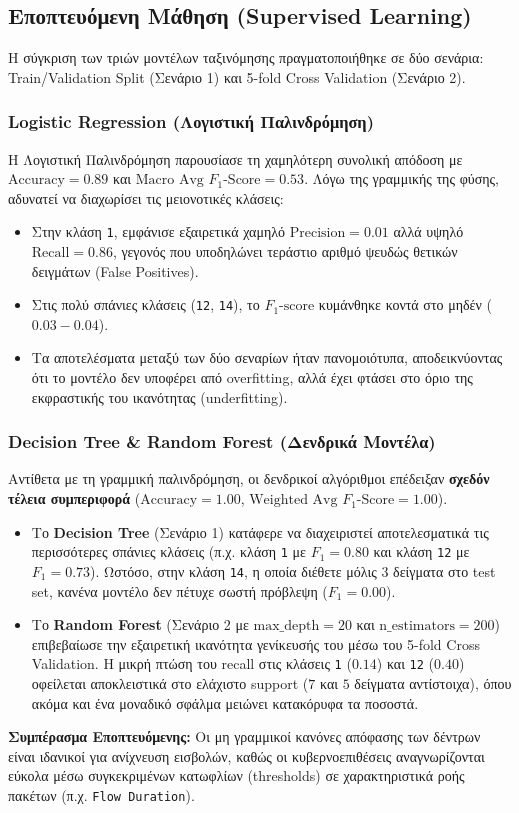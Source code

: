 \documentclass[11pt,a4paper]{article}
\begin{document}
	\subsection{Εποπτευόμενη Μάθηση (Supervised Learning)}
	Η σύγκριση των τριών μοντέλων ταξινόμησης πραγματοποιήθηκε σε δύο σενάρια: Train/Validation Split (Σενάριο 1) και 5-fold Cross Validation (Σενάριο 2).
	
	\subsubsection{Logistic Regression (Λογιστική Παλινδρόμηση)}
	Η Λογιστική Παλινδρόμηση παρουσίασε τη χαμηλότερη συνολική απόδοση με $\text{Accuracy} = 0.89$ και $\text{Macro Avg } F_1\text{-Score} = 0.53$. Λόγω της γραμμικής της φύσης, αδυνατεί να διαχωρίσει τις μειονοτικές κλάσεις:
	\begin{itemize}
		\item Στην κλάση \texttt{1}, εμφάνισε εξαιρετικά χαμηλό $\text{Precision} = 0.01$ αλλά υψηλό $\text{Recall} = 0.86$, γεγονός που υποδηλώνει τεράστιο αριθμό ψευδώς θετικών δειγμάτων (False Positives).
		\item Στις πολύ σπάνιες κλάσεις (\texttt{12}, \texttt{14}), το $F_1\text{-score}$ κυμάνθηκε κοντά στο μηδέν ($0.03 - 0.04$).
		\item Τα αποτελέσματα μεταξύ των δύο σεναρίων ήταν πανομοιότυπα, αποδεικνύοντας ότι το μοντέλο δεν υποφέρει από overfitting, αλλά έχει φτάσει στο όριο της εκφραστικής του ικανότητας (underfitting).
	\end{itemize}
	
	\subsubsection{Decision Tree \& Random Forest (Δενδρικά Μοντέλα)}
	Αντίθετα με τη γραμμική παλινδρόμηση, οι δενδρικοί αλγόριθμοι επέδειξαν \textbf{σχεδόν τέλεια συμπεριφορά} ($\text{Accuracy} = 1.00$, $\text{Weighted Avg } F_1\text{-Score} = 1.00$).
	\begin{itemize}
		\item Το \textbf{Decision Tree} (Σενάριο 1) κατάφερε να διαχειριστεί αποτελεσματικά τις περισσότερες σπάνιες κλάσεις (π.χ. κλάση \texttt{1} με $F_1 = 0.80$ και κλάση \texttt{12} με $F_1 = 0.73$). Ωστόσο, στην κλάση \texttt{14}, η οποία διέθετε μόλις $3$ δείγματα στο test set, κανένα μοντέλο δεν πέτυχε σωστή πρόβλεψη ($F_1 = 0.00$).
		\item Το \textbf{Random Forest} (Σενάριο 2 με $\text{max\_depth} = 20$ και $\text{n\_estimators} = 200$) επιβεβαίωσε την εξαιρετική ικανότητα γενίκευσής του μέσω του 5-fold Cross Validation. Η μικρή πτώση του recall στις κλάσεις \texttt{1} ($0.14$) και \texttt{12} ($0.40$) οφείλεται αποκλειστικά στο ελάχιστο support ($7$ και $5$ δείγματα αντίστοιχα), όπου ακόμα και ένα μοναδικό σφάλμα μειώνει κατακόρυφα τα ποσοστά.
	\end{itemize}
	\textbf{Συμπέρασμα Εποπτευόμενης:} Οι μη γραμμικοί κανόνες απόφασης των δέντρων είναι ιδανικοί για ανίχνευση εισβολών, καθώς οι κυβερνοεπιθέσεις αναγνωρίζονται εύκολα μέσω συγκεκριμένων κατωφλίων (thresholds) σε χαρακτηριστικά ροής πακέτων (π.χ. \texttt{Flow Duration}).
	
\end{document}

